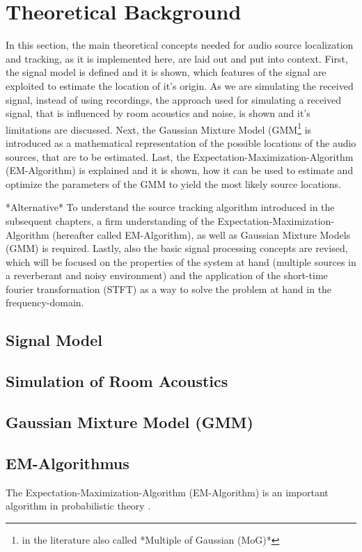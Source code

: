 \chapter{Theoretical Background}
\label{chap:theory}
In this section, the main theoretical concepts needed for audio source localization and tracking, as it is implemented here, are laid out and put into context. First, the signal model is defined and it is shown, which features of the signal are exploited to estimate the location of it's origin. As we are simulating the received signal, instead of using recordings, the approach used for simulating a received signal, that is influenced by room acoustics and noise, is shown and it's limitations are discussed. Next, the Gaussian Mixture Model (GMM\footnote{in the literature also called *Multiple of Gaussian (MoG)*} is introduced as a mathematical representation of the possible locations of the audio sources, that are to be estimated. Last, the Expectation-Maximization-Algorithm (EM-Algorithm) is explained and it is shown, how it can be used to estimate and optimize the parameters of the GMM to yield the most likely source locations.

*Alternative*
To understand the source tracking algorithm introduced in the subsequent chapters, a firm understanding of the Expectation-Maximization-Algorithm (hereafter called EM-Algorithm), as well as Gaussian Mixture Models (GMM) is required. Lastly, also the basic signal processing concepts are revised, which will be focused on the properties of the system at hand (multiple sources in a reverberant and noisy environment) and the application of the short-time fourier transformation (STFT) as a way to solve the problem at hand in the frequency-domain.

\section{Signal Model}
\section{Simulation of Room Acoustics}
\section{Gaussian Mixture Model (GMM)}
\section{EM-Algorithmus}
\label{sec:em}
The Expectation-Maximization-Algorithm (EM-Algorithm) is an important algorithm in probabilistic theory \cite{Schwartz2014}.